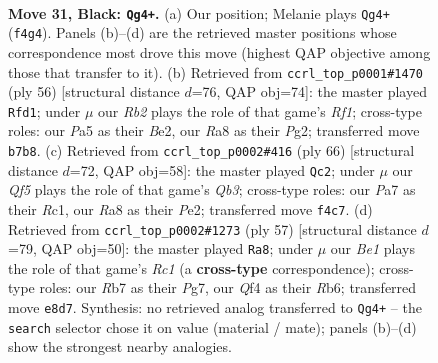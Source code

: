 \documentclass[11pt]{article}
\begin{document}
\clearpage

\begin{figure}[p]\centering
\begin{subfigure}{0.46\textwidth}\centering
\resizebox{\linewidth}{!}{%
\newchessgame
\chessboard[
  setfen={r3b1k1/pr3pP1/8/p7/2N1pq2/PP6/1Q3P2/R3R1K1 b - - 2 31},
  showmover=false,
  pgfstyle=straightmove, color=movearrow, markmove={f4-g4}
]}
\caption{}
\end{subfigure}\hfill
\begin{subfigure}{0.46\textwidth}\centering
\resizebox{\linewidth}{!}{%
\newchessgame
\chessboard[
  setfen={3r3k/p1q1rnpp/3p1p2/1Pp5/4P3/1P4QP/P2RB1P1/5R1K w - - 1 29},
  showmover=false,
  pgfstyle=straightmove, color=movearrow, markmove={f1-d1}
]}
\caption{}
\end{subfigure}
\\[4pt]
\begin{subfigure}{0.46\textwidth}\centering
\resizebox{\linewidth}{!}{%
\newchessgame
\chessboard[
  setfen={8/2r2r1k/1p2q2p/4pp2/1PP1p3/1Q4P1/4P2P/2R2R1K w - - 2 34},
  showmover=false,
  pgfstyle=straightmove, color=movearrow, markmove={b3-c2}
]}
\caption{}
\end{subfigure}\hfill
\begin{subfigure}{0.46\textwidth}\centering
\resizebox{\linewidth}{!}{%
\newchessgame
\chessboard[
  setfen={2r3k1/5pp1/1rp5/3pPq1p/3P1P2/2Q4P/5RP1/2R3K1 b - - 2 29},
  showmover=false,
  pgfstyle=straightmove, color=movearrow, markmove={c8-a8}
]}
\caption{}
\end{subfigure}
\caption{\textbf{Move 31, Black: \texttt{Qg4+}.} (a) Our position; Melanie plays \texttt{Qg4+} (\texttt{f4g4}). Panels (b)--(d) are the retrieved master positions whose correspondence most drove this move (highest QAP objective among those that transfer to it). (b) Retrieved from \texttt{ccrl\_top\_p0001\#1470} (ply 56) [structural distance $d$=76, QAP obj=74]: the master played \texttt{Rfd1}; under $\mu$ our \emph{Rb2} plays the role of that game's \emph{Rf1}; cross-type roles: our \emph{P}a5 as their \emph{B}e2, our \emph{R}a8 as their \emph{P}g2; transferred move \texttt{b7b8}. (c) Retrieved from \texttt{ccrl\_top\_p0002\#416} (ply 66) [structural distance $d$=72, QAP obj=58]: the master played \texttt{Qc2}; under $\mu$ our \emph{Qf5} plays the role of that game's \emph{Qb3}; cross-type roles: our \emph{P}a7 as their \emph{R}c1, our \emph{R}a8 as their \emph{P}e2; transferred move \texttt{f4c7}. (d) Retrieved from \texttt{ccrl\_top\_p0002\#1273} (ply 57) [structural distance $d$=79, QAP obj=50]: the master played \texttt{Ra8}; under $\mu$ our \emph{Be1} plays the role of that game's \emph{Rc1} (a \textbf{cross-type} correspondence); cross-type roles: our \emph{R}b7 as their \emph{P}g7, our \emph{Q}f4 as their \emph{R}b6; transferred move \texttt{e8d7}. Synthesis: no retrieved analog transferred to \texttt{Qg4+} -- the \texttt{search} selector chose it on value (material / mate); panels (b)--(d) show the strongest nearby analogies.}
\label{fig:thought-m61}
\end{figure}
\end{document}
